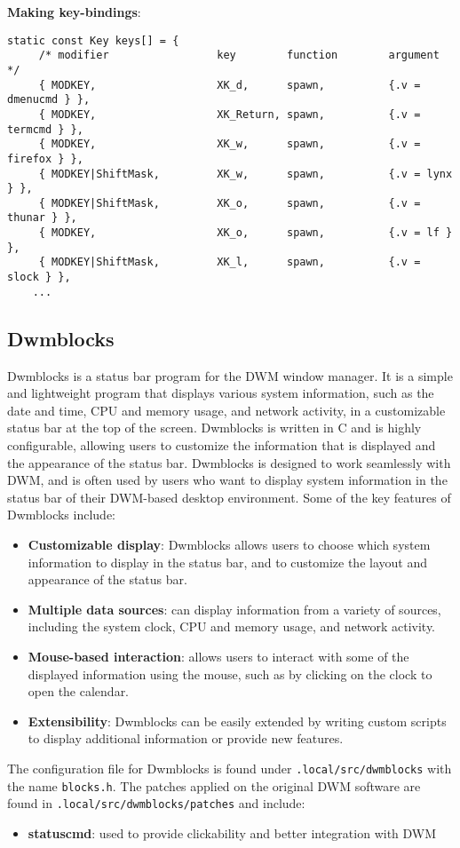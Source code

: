 \documentclass{article}
\begin{document}
\noindent\textbf{Making key-bindings}:
\begin{lstlisting}
static const Key keys[] = {
     /* modifier                 key        function        argument */
     { MODKEY,                   XK_d,      spawn,          {.v = dmenucmd } },
     { MODKEY,                   XK_Return, spawn,          {.v = termcmd } },
     { MODKEY,                   XK_w,      spawn,          {.v = firefox } },
     { MODKEY|ShiftMask,         XK_w,      spawn,          {.v = lynx } },
     { MODKEY|ShiftMask,         XK_o,      spawn,          {.v = thunar } },
     { MODKEY,                   XK_o,      spawn,          {.v = lf } },
     { MODKEY|ShiftMask,         XK_l,      spawn,          {.v = slock } },
	...
\end{lstlisting}
\subsection{Dwmblocks}

Dwmblocks is a status bar program for the DWM window manager. It is a simple and lightweight program that displays various system information, such as the date and time, CPU and memory usage, and network activity, in a customizable status bar at the top of the screen. Dwmblocks is written in C and is highly configurable, allowing users to customize the information that is displayed and the appearance of the status bar.
\newline
\newline
Dwmblocks is designed to work seamlessly with DWM, and is often used by users who want to display system information in the status bar of their DWM-based desktop environment. Some of the key features of Dwmblocks include:
\begin{itemize}
	\item \textbf{Customizable display}: Dwmblocks allows users to choose which system information to display in the status bar, and to customize the layout and appearance of the status bar.
	\item \textbf{Multiple data sources}: can display information from a variety of sources, including the system clock, CPU and memory usage, and network activity.
	\item \textbf{Mouse-based interaction}: allows users to interact with some of the displayed information using the mouse, such as by clicking on the clock to open the calendar.
	\item \textbf{Extensibility}: Dwmblocks can be easily extended by writing custom scripts to display additional information or provide new features.
\end{itemize}
The configuration file for Dwmblocks is found under \texttt{.local/src/dwmblocks} with the name \texttt{blocks.h}. The patches applied on the original DWM software are found in \texttt{.local/src/dwmblocks/patches} and include:
\begin{itemize}
	\item \textbf{statuscmd}: used to provide clickability and better integration with DWM 
\end{itemize}
\end{document}
